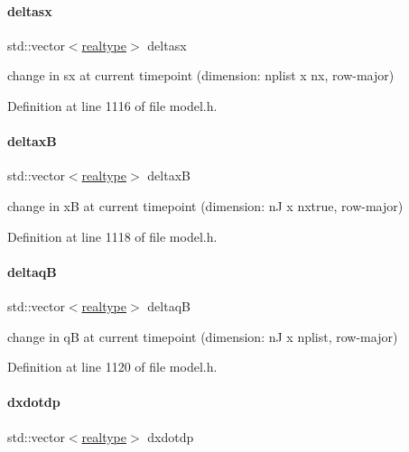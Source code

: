 \paragraph{\texorpdfstring{deltasx}{deltasx}}
{\footnotesize\ttfamily std\+::vector$<$\mbox{\hyperlink{namespaceamici_a1bdce28051d6a53868f7ccbf5f2c14a3}{realtype}}$>$ deltasx}

change in sx at current timepoint (dimension\+: nplist x nx, row-\/major) 

Definition at line 1116 of file model.\+h.

\mbox{\label{classamici_1_1_model_ad849fbfc7f8089c1a98ab6ac5ba96861}} 
\paragraph{\texorpdfstring{deltaxB}{deltaxB}}
{\footnotesize\ttfamily std\+::vector$<$\mbox{\hyperlink{namespaceamici_a1bdce28051d6a53868f7ccbf5f2c14a3}{realtype}}$>$ deltaxB}

change in xB at current timepoint (dimension\+: nJ x nxtrue, row-\/major) 

Definition at line 1118 of file model.\+h.

\mbox{\label{classamici_1_1_model_a1389b2fb29c46c42f7c24b4d5972af7a}} 
\paragraph{\texorpdfstring{deltaqB}{deltaqB}}
{\footnotesize\ttfamily std\+::vector$<$\mbox{\hyperlink{namespaceamici_a1bdce28051d6a53868f7ccbf5f2c14a3}{realtype}}$>$ deltaqB}

change in qB at current timepoint (dimension\+: nJ x nplist, row-\/major) 

Definition at line 1120 of file model.\+h.

\mbox{\label{classamici_1_1_model_adba071f2419937047304600d4dad9b04}} 
\paragraph{\texorpdfstring{dxdotdp}{dxdotdp}}
{\footnotesize\ttfamily std\+::vector$<$\mbox{\hyperlink{namespaceamici_a1bdce28051d6a53868f7ccbf5f2c14a3}{realtype}}$>$ dxdotdp}

